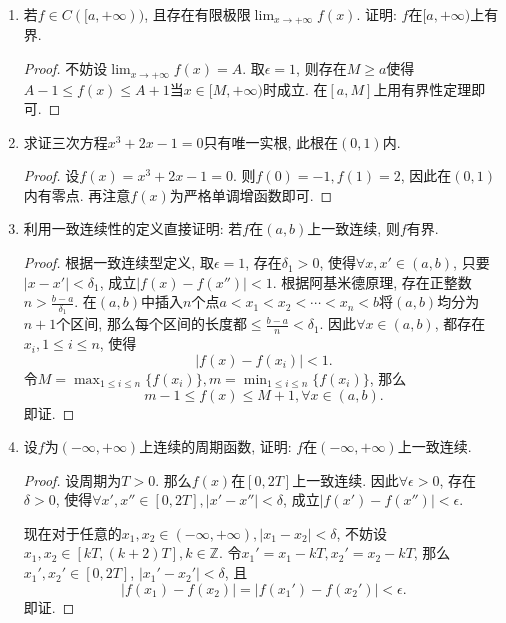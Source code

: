 \documentclass[UTF8,11pt, a4paper, oneside, fontset=none]{ctexbook}
\begin{document}
\begin{enumerate}
\begin{proof}
\end{proof}

\item 若$f \in C([a, +\infty))$, 且存在有限极限$\lim_{x \to +\infty}f(x)$. 证明: $f$在$[a, +\infty)$上有界.

\begin{proof}

不妨设$\lim_{x \to +\infty}f(x)=A$. 取$\epsilon =1$, 则存在$M \geq a$使得$A-1\leq f(x) \leq A+1$当$x \in [M, +\infty)$时成立. 在$[a, M]$上用有界性定理即可.

\end{proof}

\item 求证三次方程$x^3 + 2x -1=0$只有唯一实根, 此根在$(0, 1)$内.

\begin{proof}

设$f(x) = x^3 + 2x -1=0$. 则$f(0) =-1, f(1) = 2$, 因此在$(0, 1)$内有零点. 再注意$f(x)$为严格单调增函数即可.

\end{proof}

\item 利用一致连续性的定义直接证明: 若$f$在$(a, b)$上一致连续, 则$f$有界.

\begin{proof}

根据一致连续型定义, 取$\epsilon =1$, 存在$\delta_1 > 0$, 使得$\forall x, x' \in (a, b)$, 只要$|x - x'|<\delta_1$, 成立$|f(x) - f(x'')|<1$. 根据阿基米德原理, 存在正整数$n > \frac{b-a}{\delta_1}$. 在$(a ,b)$中插入$n$个点$a<x_1< x_2 < \cdots < x_n<b$将$(a, b)$均分为$n+1$个区间, 那么每个区间的长度都$\leq \frac{b-a}{n} < \delta_1$. 因此$\forall x \in (a, b)$, 都存在$x_i, 1 \leq i \leq n$, 使得
\[
|f(x) - f(x_i)| < 1.
\]
令$M  = \max_{1 \leq i \leq n}\{ f(x_i)\}, m = \min_{1 \leq i \leq n}\{ f(x_i)\}$, 那么
\[
m-1 \leq f(x) \leq M+1, \forall x \in (a, b).
\]
即证.

\end{proof}

\item 设$f$为$(-\infty, +\infty)$上连续的周期函数, 证明: $f$在$(-\infty, +\infty)$上一致连续.

\begin{proof}

设周期为$T >0$. 那么$f(x)$在$[0, 2T]$上一致连续. 因此$\forall \epsilon>0$, 存在$\delta >0$, 使得$\forall x', x'' \in [0, 2T], |x'-x''|< \delta$, 成立$|f(x') -f(x'')| <\epsilon$.


现在对于任意的$x_1, x_2 \in (-\infty, +\infty), |x_1 - x_2|<\delta$, 不妨设$x_1, x_2 \in [kT, (k+2)T], k \in \mathbb Z$. 令$x_1' =x_1 - kT, x_2' =x_2 -kT $, 那么$x_1', x_2' \in [0, 2T]$, $|x_1' -x_2'| < \delta$, 且
\[
|f(x_1) - f(x_2)| = |f(x_1') - f(x_2')| < \epsilon.
\]
即证.

\end{proof}

\end{enumerate}
\end{document}
